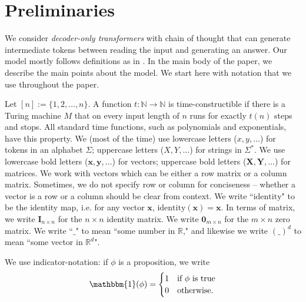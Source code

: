 \documentclass{article}
\theoremstyle{definition}
\newcommand{\R}{\mathbb{R}}
\newcommand{\x}{\mathbf{x}}
\newcommand{\I}{\mathbf{I}}
\newcommand{\0}{\mathbf{0}}
\newcommand{\identity}{\text{identity}}
\newcommand{\1}{\mathbbm{1}}
\begin{document}



\section{Preliminaries}
We consider \textit{decoder-only transformers} with chain of thought that can generate intermediate tokens between reading the input and generating an answer. Our model mostly follows definitions as in \cite{merrill2023expressive}. %
In the main body of the paper, we describe the main points about the model. We start here with notation that we use throughout the paper.  

 Let $[n] := \{1, 2, \dots, n\}$. A function $t: \mathbb{N} \rightarrow \mathbb{N}$ is time-constructible if there is a Turing machine $M$ that on every input length of $n$ runs for exactly $t(n)$ steps and stops. All standard time functions, such as polynomials and exponentials, have this property. We (most of the time) use lowercase letters ($x, y,\dots$) for tokens in an alphabet $\Sigma$; uppercase letters ($X, Y, \dots$) for strings in $\Sigma^*$. We use lowercase bold letters ($\mathbf{x}, \mathbf{y}, \dots$) for vectors; uppercase bold letters ($\mathbf{X}, \mathbf{Y}, \dots$) for matrices. We work with vectors which can be either a row matrix or a column matrix. Sometimes, we do not specify row or column for conciseness -- whether a vector is a row or a column should be clear from context. We write ``$\identity$" to be the identity map, i.e. for any vector $\x$, $\identity(\x) = \x$. In terms of matrix, we write $\I_{n \times n}$ for the $n \times n$ identity matrix. We write $\0_{m \times n}$ for the $m \times n$ zero matrix. We write ``$\_$" to mean ``some number in $\R$," and likewise we write $(\_)^d$ to mean ``some vector in $\R^d$". 

 We use indicator-notation: if $\phi$ is a proposition, we write 
    \begin{equation*}
        \1(\phi) = \begin{cases}
            1 &\text{if $\phi$ is true} \\
            0 & \text{otherwise.}
        \end{cases}
    \end{equation*}
\end{document}
